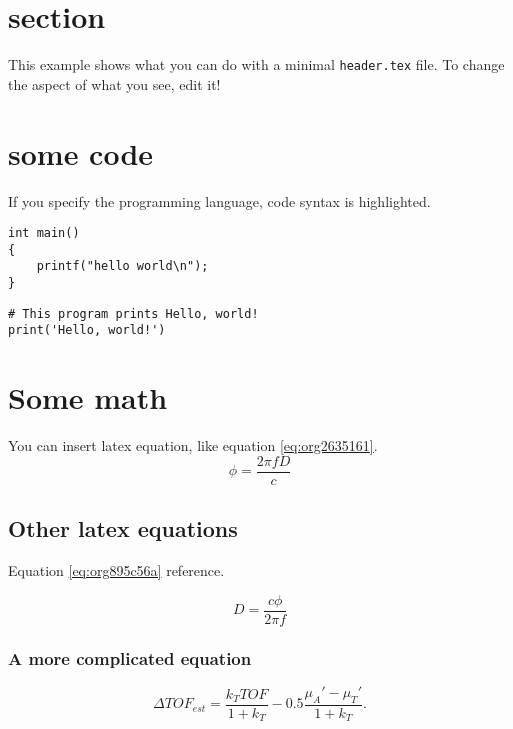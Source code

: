 


\maketitle

\newpage

\section{section}
\label{sec:org9a6d640}
This example shows what you can do with a minimal \texttt{header.tex} file.
To change the aspect of what you see, edit it!

\section{some code}
\label{sec:org45cb246}
If you specify the programming language, code syntax is highlighted.
\begin{verbatim}
int main()
{
    printf("hello world\n");
}
\end{verbatim}

\begin{verbatim}
# This program prints Hello, world!
print('Hello, world!')
\end{verbatim}

\section{Some math}
\label{sec:org97019ee}
You can insert latex equation, like equation \ref{eq:org2635161}.
\begin{equation}
\label{eq:org2635161}
\phi = \frac{2\pi fD}{c}
\end{equation}
\subsection{Other latex equations}
\label{sec:orgee3bdc3}
Equation \ref{eq:org895c56a} reference.

\begin{equation}
\label{eq:org895c56a}
D = \frac{c\phi}{2\pi f}
\end{equation}

\subsubsection{A more complicated equation}
\label{sec:orgda74481}

\begin{equation}
\Delta TOF_{est} = \frac{k_T TOF}{1+k_T } - 0.5 \frac{\mu_A' - \mu_T'}{1+k_T}.
\end{equation}

